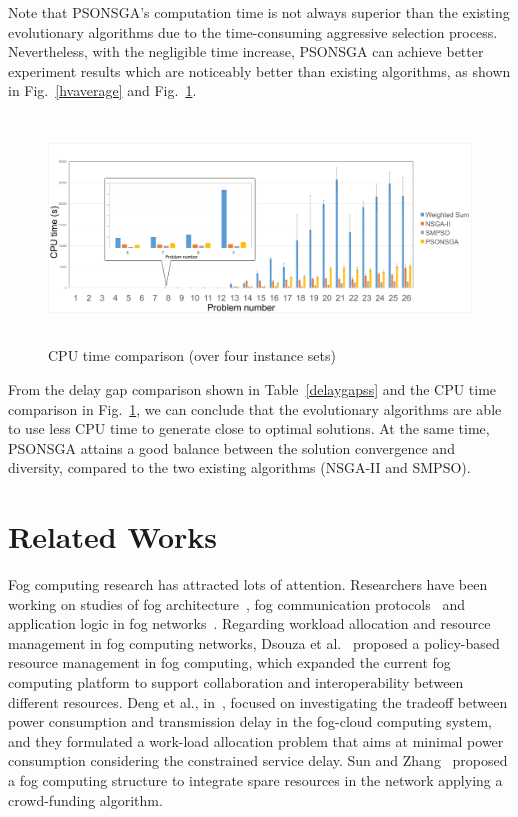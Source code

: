 \documentclass[10pt,journal,compsoc]{IEEEtran}
\newcommand{\Fig}[1]{Fig.~\ref{#1}}
\begin{document}
Note that PSONSGA’s computation time is not always superior than the existing evolutionary algorithms due to the time-consuming aggressive selection process. Nevertheless, with the negligible time increase, PSONSGA can achieve better experiment results which are noticeably better than existing algorithms, as shown in \Fig{hvaverage} and \Fig{cputimeover4}.
\begin{figure}[ht]
\centerline{\includegraphics[page=1,width=\textwidth,height=6cm]{cputimeover4withzoom}}
\caption{CPU time comparison (over four instance sets)} 
\label{cputimeover4}
\end{figure}

From the delay gap comparison shown in Table~\ref{delaygapss} and the CPU time comparison in \Fig{cputimeover4}, we can conclude that the evolutionary algorithms are able to use less CPU time to generate close to optimal solutions. At the same time, PSONSGA attains a good balance between the solution convergence and diversity, compared to the two existing algorithms (NSGA-II and SMPSO).


\section{Related Works}\label{relwork}
Fog computing research has attracted lots of attention. Researchers have been working on studies of fog architecture~\cite{fcsmartcity}, fog communication protocols~\cite{Peng:2016:FRA:3029494.3029575} and application logic in fog networks~\cite{SUN2017687}. Regarding workload allocation and resource management in fog computing networks, Dsouza et al.~\cite{secme} proposed a policy-based resource management in fog computing, which expanded the current fog computing platform to support collaboration and interoperability between different resources. Deng et al., in~\cite{fcworkload}, focused on investigating the tradeoff between power consumption and transmission delay in the fog-cloud computing system, and they formulated a work-load allocation problem that aims at minimal power consumption considering the constrained service delay. Sun and Zhang~\cite{SUN2017687} proposed a fog computing structure to integrate spare resources in the network applying a crowd-funding algorithm.
\end{document}
